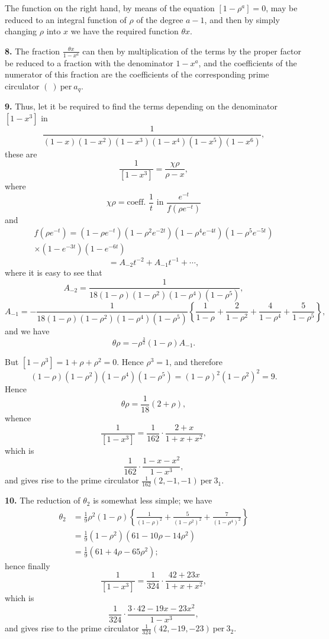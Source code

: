 \documentclass[12pt,a4paper]{article}
\theoremstyle{definition}
\begin{document}
The function on the right hand, by means of the equation $[1-\rho^a]=0$, may be reduced to an integral function of $\rho$ of the degree $a-1$, and then by simply changing $\rho$ into $x$ we have the required function $\theta x$.

\medskip
\noindent\textbf{8.} The fraction $\frac{\theta x}{1-x^a}$ can then by multiplication of the terms by the proper factor be reduced to a fraction with the denominator $1-x^a$, and the coefficients of the numerator of this fraction are the coefficients of the corresponding prime circulator $(\ )\ \mathrm{per}\ a_q$.

\medskip
\noindent\textbf{9.} Thus, let it be required to find the terms depending on the denominator $[1-x^3]$ in
\[\frac{1}{(1-x)(1-x^2)(1-x^3)(1-x^4)(1-x^5)(1-x^6)},\]
these are
\[\frac{1}{[1-x^3]} = \frac{\chi \rho}{\rho - x},\]
where
\[\chi \rho = \text{coeff. } \frac{1}{t} \text{ in } \frac{e^{-t}}{f(\rho e^{-t})}\]
and
\begin{multline*}
f(\rho e^{-t}) = (1-\rho e^{-t})(1-\rho^2 e^{-2t})(1-\rho^4 e^{-4t})(1-\rho^5 e^{-5t}) \\
\times (1-e^{-3t})(1-e^{-6t})
\end{multline*}
\[= A_{-2}t^{-2} + A_{-1}t^{-1} + \cdots,\]
where it is easy to see that
\[A_{-2} = \frac{1}{18(1-\rho)(1-\rho^2)(1-\rho^4)(1-\rho^5)},\]
\[A_{-1} = -\frac{1}{18(1-\rho)(1-\rho^2)(1-\rho^4)(1-\rho^5)}\left\{\frac{1}{1-\rho}+\frac{2}{1-\rho^2}+\frac{4}{1-\rho^4}+\frac{5}{1-\rho^5}\right\},\]
and we have
\[\theta \rho = -\rho^{\frac{3}{2}}(1-\rho) A_{-1}.\]

But $[1-\rho^3] = 1+\rho+\rho^2 = 0$. Hence $\rho^3=1$, and therefore
\[(1-\rho)(1-\rho^2)(1-\rho^4)(1-\rho^5) = (1-\rho)^2(1-\rho^2)^2 = 9.\]
Hence
\[\theta \rho = \frac{1}{18}(2+\rho),\]
whence
\[\frac{1}{[1-x^3]} = \frac{1}{162} \cdot \frac{2+x}{1+x+x^2},\]
which is
\[\frac{1}{162} \cdot \frac{1-x-x^2}{1-x^3},\]
and gives rise to the prime circulator $\frac{1}{162}(2,-1,-1)\ \mathrm{per}\ 3_1$.

\newpage

\medskip
\noindent\textbf{10.} The reduction of $\theta_2$ is somewhat less simple; we have
\begin{align*}
\theta_2 &= \frac{1}{9}\rho^2(1-\rho)\left\{\frac{1}{(1-\rho)^2} + \frac{5}{(1-\rho^2)^2} + \frac{7}{(1-\rho^4)^2}\right\} \\
&= \frac{1}{9}(1-\rho^2)(61-10\rho-14\rho^2) \\
&= \frac{1}{9}(61+4\rho-65\rho^2);
\end{align*}
hence finally
\[\frac{1}{[1-x^3]} = \frac{1}{324} \cdot \frac{42+23x}{1+x+x^2},\]
which is
\[\frac{1}{324} \cdot \frac{3 \cdot 42 - 19x - 23x^2}{1-x^3},\]
and gives rise to the prime circulator $\frac{1}{324}(42,-19,-23)\ \mathrm{per}\ 3_2$.
\end{document}
